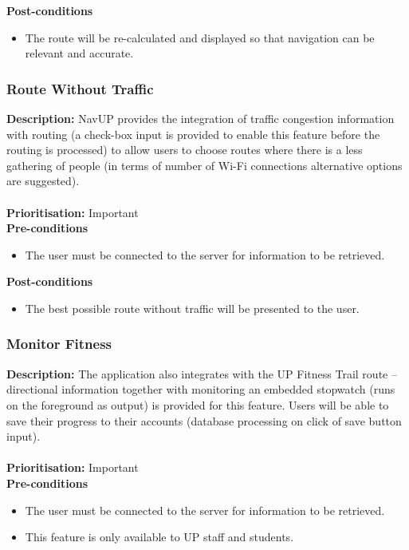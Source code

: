 \documentclass[runningheads,a4paper]{article}
\begin{document}
\textbf{Post-conditions}
\begin{itemize}
  	\item The route will be re-calculated and displayed so that navigation can be relevant and accurate.
\end{itemize}

\subsubsection{Route Without Traffic}

\textbf{Description:}  NavUP provides the integration of traffic congestion information with routing (a check-box input is provided to enable this feature before the routing is processed) to allow users to choose routes where there is a less gathering of people (in terms of number of Wi-Fi connections alternative options are suggested).\\\\
\noindent
\textbf{Prioritisation:} Important\\
  
  
\textbf{Pre-conditions}
\begin{itemize}
	\item The user must be connected to the server for information to be retrieved.
\end{itemize}
  
\textbf{Post-conditions}
\begin{itemize}
  	\item The best possible route without traffic will be presented to the user.
\end{itemize}

\subsubsection{Monitor Fitness}

\textbf{Description:} The application also integrates with the UP Fitness Trail route – directional information together with monitoring an embedded stopwatch (runs on the foreground as output) is provided for this feature. Users will be able to save their progress to their accounts (database processing on click of save button input).\\\\
\noindent
\textbf{Prioritisation:} Important\\
  
  
\textbf{Pre-conditions}
\begin{itemize}
	\item The user must be connected to the server for information to be retrieved.
	\item This feature is only available to UP staff and students.
\end{itemize}
  
\end{document}
